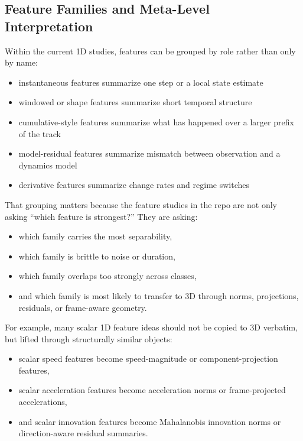 \documentclass[11pt]{article}
\begin{document}
\subsection{Feature Families and Meta-Level Interpretation}

Within the current 1D studies, features can be grouped by role rather than only
by name:
\begin{itemize}[leftmargin=1.5em]
    \item instantaneous features summarize one step or a local state estimate
    \item windowed or shape features summarize short temporal structure
    \item cumulative-style features summarize what has happened over a larger
    prefix of the track
    \item model-residual features summarize mismatch between observation and a
    dynamics model
    \item derivative features summarize change rates and regime switches
\end{itemize}

That grouping matters because the feature studies in the repo are not only
asking ``which feature is strongest?'' They are asking:
\begin{itemize}[leftmargin=1.5em]
    \item which family carries the most separability,
    \item which family is brittle to noise or duration,
    \item which family overlaps too strongly across classes,
    \item and which family is most likely to transfer to 3D through norms,
    projections, residuals, or frame-aware geometry.
\end{itemize}

For example, many scalar 1D feature ideas should not be copied to 3D verbatim,
but lifted through structurally similar objects:
\begin{itemize}[leftmargin=1.5em]
    \item scalar speed features become speed-magnitude or component-projection
    features,
    \item scalar acceleration features become acceleration norms or
    frame-projected accelerations,
    \item and scalar innovation features become Mahalanobis innovation norms or
    direction-aware residual summaries.
\end{itemize}
\end{document}
